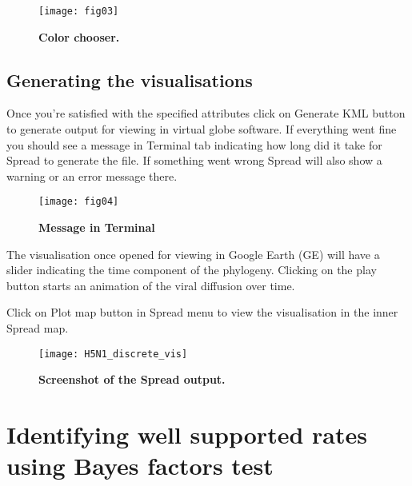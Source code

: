 \begin{figure}[h!]
\begin{centering}
\texttt{[image: fig03]}
\caption{
{ \footnotesize 
{\bf Color chooser.}
} %
}
\label{fig:03}
\par\end{centering}
\end{figure}


\subsection{Generating the visualisations}

Once you're satisfied with the specified attributes click on Generate
KML button to generate output for viewing in virtual globe software.
If everything went fine you should see a message in Terminal tab indicating
how long did it take for Spread to generate the file. If something
went wrong Spread will also show a warning or an error message there.


\begin{figure}[h!]
\begin{centering}
\texttt{[image: fig04]}
\caption{
{ \footnotesize 
{\bf Message in Terminal}
} %
}
\label{fig:04}
\par\end{centering}
\end{figure}

The visualisation once opened for viewing in Google Earth (GE) will
have a slider indicating the time component of the phylogeny. Clicking
on the play button starts an animation of the viral diffusion over
time. 

Click on Plot map button in Spread menu to view the visualisation
in the inner Spread map. 


\begin{figure}[h!]
\begin{centering}
\texttt{[image: H5N1\_discrete\_vis]}
\caption{
{ \footnotesize 
{\bf Screenshot of the Spread output.}
} %
}
\label{fig:05}
\par\end{centering}
\end{figure}

\section{Identifying well supported rates using Bayes factors test}


